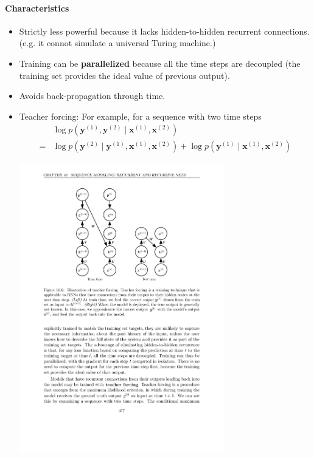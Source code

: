 \documentclass[12pt, a4paper]{article}
\newcommand{\egvx}[1]{\boldsymbol{x}^{(#1)}}
\newcommand{\egvy}[1]{\boldsymbol{y}^{(#1)}}
\begin{document}
\paragraph{Characteristics}
\begin{itemize}
    \item Strictly less powerful because it lacks hidden-to-hidden recurrent connections. (e.g. it connot simulate a universal Turing machine.)
    \item Training can be \textbf{parallelized} because all the time steps are decoupled (the training set provides the ideal value of previous output).
    \item Avoids back-propagation through time.
    \item Teacher forcing:
        For example, for a sequence with two time steps
        \[
            \begin{split}
                &\log p\left( \egvy{1},\egvy{2} \mid \egvx{1},\egvx{2} \right)
                \\=& \log p\left(\egvy{2} \mid \egvy{1},\egvx{1},\egvx{2} \right) + \log p\left( \egvy{1} \mid \egvx{1},\egvx{2} \right)
            \end{split}
        \]
        \begin{center}
            \includegraphics[width=0.7\textwidth]{../imgs/Teacher_Forcing.pdf}
        \end{center}
\end{itemize}
\end{document}

